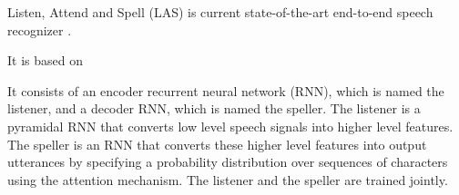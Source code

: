 Listen, Attend and Spell (LAS) is current state-of-the-art end-to-end speech recognizer \cite{las}.

It is based on

It consists of an encoder recurrent neural network (RNN), which is named the listener, and a decoder RNN, which is named the speller.
The listener is a pyramidal RNN that converts low level speech signals into higher level features.
The speller is an RNN that converts these higher level features into output utterances by specifying a probability distribution over sequences of characters using the attention mechanism.
The listener and the speller are trained jointly.
